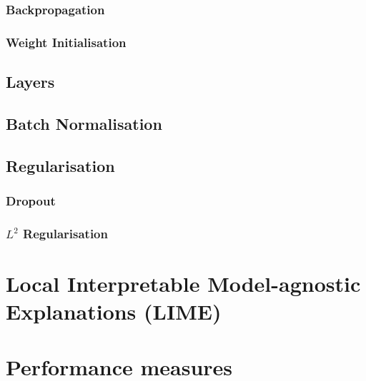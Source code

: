             \subsubsection{Backpropagation}
            
            \subsubsection{Weight Initialisation}
            
            \lipsum[1-2]
    
        \subsection{Layers}
            
            \subsection{Batch Normalisation}
            
        \subsection{Regularisation}
        
            \subsubsection{Dropout}
            
            \subsubsection{$L^2$ Regularisation}
            
        
\section{Local Interpretable Model-agnostic Explanations (LIME)}

\section{Performance measures}

